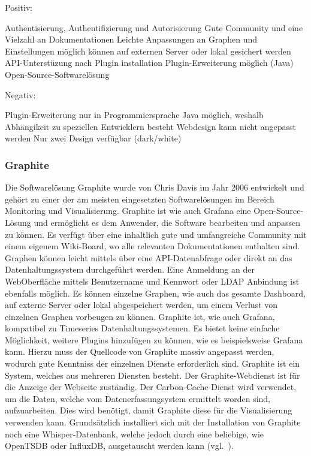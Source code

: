 Positiv:

\begin{outline}
  \1 Authentisierung, Authentifizierung und Autorisierung
  \1 Gute Community und eine Vielzahl an Dokumentationen
  \1 Leichte Anpassungen an Graphen und Einstellungen möglich
  \1  können auf externen Server oder lokal
  gesichert werden
  \1 \gls{API}\hyp{}Unterstüzung nach Plugin installation
  \1 Plugin\hyp{}Erweiterung möglich (Java)
  \1 Open\hyp{}Source\hyp{}Softwarelösung
\end{outline}

Negativ:

\begin{outline}
  \1 Plugin\hyp{}Erweiterung nur in Programmiersprache Java möglich, weshalb
  Abhängikeit zu speziellen Entwicklern besteht
  \1 Webdesign kann nicht angepasst werden
  \1 Nur zwei Design  verfügbar (dark/white)
\end{outline}
\mr%

\subsubsection{Graphite}
\label{subsubsec:graphite}
Die Softwarelösung Graphite wurde von Chris Davis im Jahr 2006 entwickelt und
gehört zu einer der am meisten eingesetzten Softwarelösungen im Bereich
Monitoring und Visualisierung. Graphite ist wie auch Grafana eine
Open\hyp{}Source\hyp{}Lösung und ermöglicht es dem Anwender, die Software
bearbeiten und anpassen zu können. Es verfügt über eine inhaltlich gute und
umfangreiche Community mit einem eigenem Wiki\hyp{}Board, wo alle relevanten
Dokumentationen enthalten sind. Graphen können leicht mittels
 über eine \gls{API}\hyp{}Datenabfrage oder
direkt an das Datenhaltungssystem durchgeführt werden. Eine Anmeldung an der
WebOberfläche mittels Benutzername und Kennwort oder \gls{LDAP} Anbindung ist
ebenfalls möglich. Es können einzelne Graphen, wie auch das gesamte
\gls{Dashboard}, auf externe Server oder lokal abgespeichert werden, um einem
Verlust von einzelnen Graphen vorbeugen zu können. Graphite ist, wie auch
Grafana, kompatibel zu Timeseries Datenhaltungssystemen. Es bietet keine
einfache Möglichkeit, weitere Plugins hinzufügen zu können, wie es
beispielsweise Grafana kann. Hierzu muss der Quellcode von Graphite massiv
angepasst werden, wodurch gute Kenntniss der einzelnen Dienste erforderlich
sind. Graphite ist ein System, welches aus mehreren Diensten besteht. Der
Graphite\hyp{}Webdienst ist für die Anzeige der Webseite zuständig. Der
\gls{Carbon}\hyp{}Cache\hyp{}Dienst wird verwendet, um die Daten, welche vom
Datenerfassungsystem ermittelt worden sind, aufzuarbeiten. Dies wird benötigt,
damit Graphite diese für die Visualisierung verwenden kann. Grundsätzlich
installiert sich mit der Installation von Graphite noch eine
Whisper\hyp{}Datenbank, welche jedoch durch eine beliebige, wie OpenTSDB oder
InfluxDB, ausgetauscht werden kann (vgl.~\cite{graphite}).

